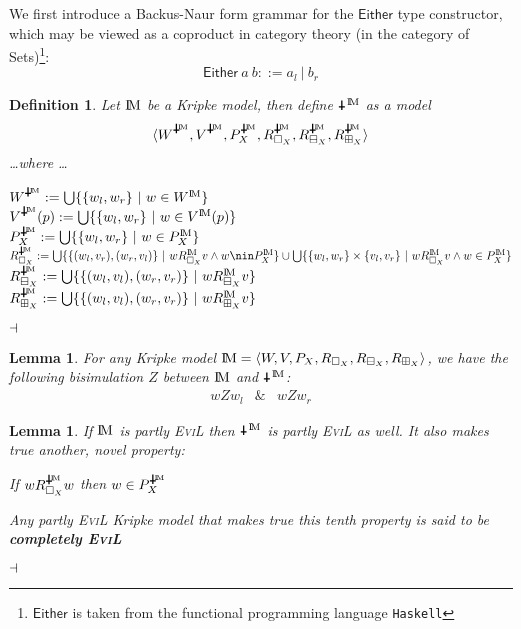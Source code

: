 \documentclass[11pt]{article}
\numberwithin{equation}{subsection}
\newtheorem{mydef}[theorem]{Definition}
\newtheorem{lemma}[theorem]{Lemma}
\newcommand{\ra}{\rangle}
\newcommand{\la}{\langle}
\newcommand{\Nec}{\Box}
\newcommand{\BB}{\boxminus}
\newcommand{\BBI}{\boxplus}
\newcommand{\invis}{\mathrel{\reflectbox{\rotatebox[origin=c]{180}{\textrm{\ding{61}}}}}\!}
\begin{document}
We first introduce a Backus-Naur form grammar for the $\mathsf{Either}$ type constructor, which may be viewed as a coproduct in category theory (in the category of Sets)\footnote{$\mathsf{Either}$ is taken from the functional programming language \texttt{Haskell}}:
\[ \mathsf{Either}\ a\ b ::= a_l \ |\ b_r \]
\begin{mydef}
Let $\bbM$ be a Kripke model, then define $\invis^\bbM$ as a model
\[\la W^{\invis^\bbM},V^{\invis^\bbM}, P^{\invis^\bbM}_X,R^{\invis^\bbM}_{\Nec_X},R^{\invis^\bbM}_{\BB_X},R^{\invis^\bbM}_{\BBI_X}\ra\] 
\ldots where \ldots
\begin{tabbing}
$W^{\invis^\bbM} := \bigcup\{\{w_l,w_r\}\ |\ w\in W^\bbM\}$\\
$V^{\invis^\bbM}(p) := \bigcup\{\{w_l,w_r\}\ |\ w\in V^\bbM(p)\}$\\
$P^{\invis^\bbM}_X := \bigcup\{\{w_l,w_r\}\ |\  w\in P^\bbM_X\}$\\
$R^{\invis^\bbM}_{\Nec_X} := \bigcup\{\{(w_l,v_r),(w_r,v_l)\}\ |\ w R^\bbM_{\Nec_X} v \wedge w \nin P^\bbM_X\} \cup \bigcup\{\{w_l,w_r\}\times \{v_l,v_r\}\ |\ w R^\bbM_{\Nec_X} v \wedge w \in P^\bbM_X\}$\\
$R^{\invis^\bbM}_{\BB_X} := \bigcup\{\{(w_l,v_l),(w_r,v_r)\}\ | \ w R^\bbM_{\BB_X} v \}$ \\
$R^{\invis^\bbM}_{\BBI_X} := \bigcup\{\{(w_l,v_l),(w_r,v_r)\}\ | \ w R^\bbM_{\BBI_X} v \}$
\end{tabbing}
$\hfill\dashv$
\end{mydef}
\begin{lemma}\label{bisimulation}
For any Kripke model $\bbM = \la W,V,P_X,R_{\Nec_X},R_{\BB_X}, R_{\BBI_X}\ra$, we have the following bisimulation $Z$ between $\bbM$ and $\invis^\bbM$:
\begin{eqnarray*} w Z w_l & \& & w Z w_r \end{eqnarray*}
\end{lemma}

\begin{lemma}
If $\bbM$ is partly \textsc{EviL} then $\invis^\bbM$ is partly \textsc{EviL} as well.  It also makes true another, novel property: 
\begin{mynum}[start=10,resume]
\item If $w R^{\invis^\bbM}_{\Nec_X} w$ then $w\in P^{\invis^\bbM}_X$
\end{mynum}
Any partly \textsc{EviL} Kripke model that makes true this tenth property is said to be \textbf{completely \textsc{EviL}}

$\hfill\dashv$
\end{lemma}
\end{document}
